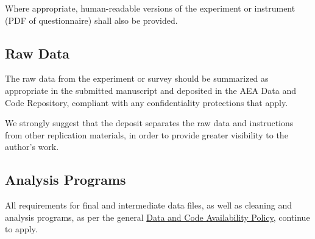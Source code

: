 Where appropriate, human-readable versions of the experiment or
instrument (PDF of questionnaire) shall also be provided.

\subsection{Raw Data}\label{raw-data}

The raw data from the experiment or survey should be summarized as
appropriate in the submitted manuscript and deposited in the AEA Data
and Code Repository, compliant with any confidentiality protections that
apply.

We strongly suggest that the deposit separates the raw data and
instructions from other replication materials, in order to provide
greater visibility to the author's work.

\subsection{Analysis Programs}\label{analysis-programs}

All requirements for final and intermediate data files, as well as
cleaning and analysis programs, as per the general
\hyperref[data-and-code-availability-policy]{Data and Code Availability Policy}, continue to
apply.
